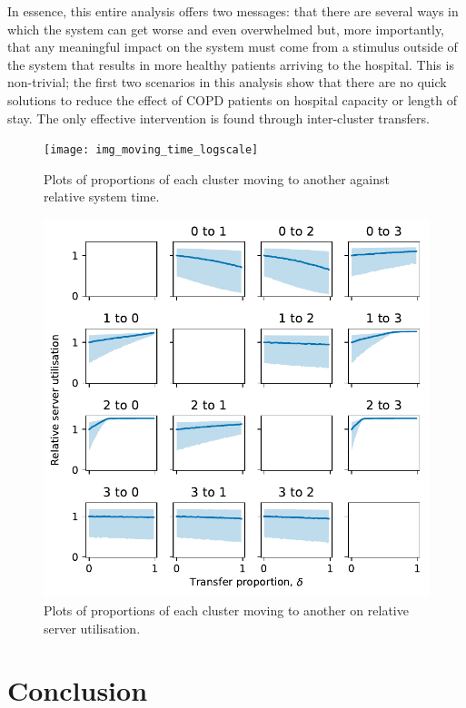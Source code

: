 \documentclass[11pt]{article}
\newlength{\imgwidth}
\begin{document}
In essence, this entire analysis offers two messages: that there are several
ways in which the system can get worse and even overwhelmed but, more
importantly, that any meaningful impact on the system must come from a stimulus
outside of the system that results in more healthy patients arriving to the
hospital. This is non-trivial; the first two scenarios in this analysis show
that there are no quick solutions to reduce the effect of COPD patients on
hospital capacity or length of stay. The only effective intervention is found
through inter-cluster transfers.

\begin{figure}
    \centering
    \texttt{[image: img\_moving\_time\_logscale]}
    \caption{%
        Plots of proportions of each cluster moving to another against relative
        system time.
    }\label{fig:moving_time}
\end{figure}

\begin{figure}
    \centering
    \includegraphics[width=\imgwidth]{img_moving_util}
    \caption{%
        Plots of proportions of each cluster moving to another on relative
        server utilisation.
    }\label{fig:moving_util}
\end{figure}

\section{Conclusion}\label{sec:conclusion}
\end{document}
